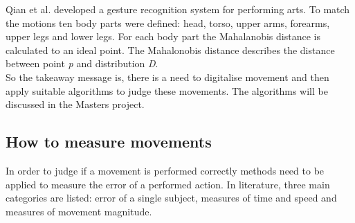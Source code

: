 Qian et al. \cite{GangQian2005} developed a gesture recognition system for performing arts. To match the motions ten body parts were defined: head, torso, upper arms, forearms, upper legs and lower legs. For each body part the Mahalanobis distance is calculated to an ideal point. The Mahalonobis distance describes the distance between point \textit{p} and distribution \textit{D}.\\
So the takeaway message is, there is a need to digitalise movement and then apply suitable algorithms to judge these movements. The algorithms will be discussed in the Masters project.

\subsection{How to measure movements}
In order to judge if a movement is performed correctly methods need to be applied to measure the error of a performed action. In literature, three main categories are listed: error of a single subject, measures of time and speed and measures of movement magnitude. 
